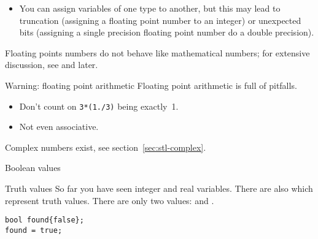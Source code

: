 \begin{itemize}
\item You can assign variables of one type to another, but this may
  lead to truncation (assigning a floating point number to an integer)
  or unexpected bits (assigning a single precision floating point
  number do a double precision).
\end{itemize}

Floating points numbers do not behave like mathematical numbers;
for extensive discussion, see  and later.

\begin{block}{Warning: floating point arithmetic}
  \label{sl:float-arith}
  Floating point arithmetic is full of pitfalls.
  \begin{itemize}
  \item Don't count on \lstinline{3*(1./3)} being exactly~1.
  \item Not even associative.
  \end{itemize}
\end{block}

\begin{comment}
  The following exercise illustrates another point about computer numbers.

  \begin{exercise}
    \label{ex:macheps}
    Define 
    \begin{lstlisting}
      float one = 1.;
    \end{lstlisting}
    and
    \begin{enumerate}
    \item Read a \lstinline{float eps},
    \item Make a new variable that has the value \lstinline{one+eps}. Print
      this.
    \item Make another variable that is the previous one minus
      \lstinline{one}. Print the result again.
    \item Test your program with \lstinline{.001}, \lstinline{.0001}, \lstinline{.00001},
      \lstinline{000001}. Do you understand the result?
    \end{enumerate}
  \end{exercise}
\end{comment}

Complex numbers exist, see section~\ref{sec:stl-complex}.

 {Boolean values}

\begin{block}{Truth values}
  \label{sl:bool-var}
  So far you have seen integer and real variables. There are also
   which represent truth values. There are
  only two values:  and .
\begin{lstlisting}
bool found{false};
found = true;
\end{lstlisting}
\end{block}

